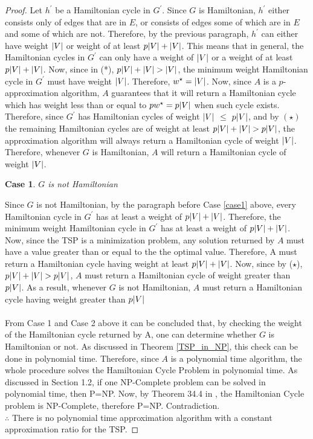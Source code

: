 \documentclass[12pt]{article}
\newtheorem{case}{Case}
\numberwithin{equation}{subsection}
\numberwithin{table}{subsection}
\begin{document}
\begin{proof}
Let $h^\prime$ be a Hamiltonian cycle in $G^\prime$. Since $G$ is Hamiltonian, $h^\prime$ either consists only of edges that are in $E$, or consists of edges some of which are in $E$ and some of which are not. Therefore, by the previous paragraph, $h^\prime$ can either have weight $\abs{V}$ or weight of at least $p\abs{V} + \abs{V}$. This means that in general, the Hamiltonian cycles in $G^\prime$ can only have a weight of $\abs{V}$ or a weight of at least $p\abs{V} + \abs{V}$. Now, since in (*), $p\abs{V} + \abs{V} > \abs{V}$, the minimum weight Hamiltonian cycle in $G^\prime$ must have weight $\abs{V}$. Therefore, $w^\star = \abs{V}$. Now, since $A$ is a $p$-approximation algorithm, $A$ guarantees that it will return a Hamiltonian cycle which has weight less than or equal to $pw^\star = p\abs{V}$ when such cycle exists. Therefore, since $G^\prime$ has Hamiltonian cycles of weight $\abs{V}$ $\leq$ $p\abs{V}$, and by $(\star)$ the remaining Hamiltonian cycles are of weight at least $ p\abs{V} + \abs{V} > p\abs{V}$, the approximation algorithm will always return a Hamiltonian cycle of weight $\abs{V}$. Therefore, whenever $G$ is Hamiltonian, $A$ will return a Hamiltonian cycle of weight $\abs{V}$.
\begin{case}
$G$ is not Hamiltonian
\end{case}
Since $G$ is not Hamiltonian, by the paragraph before Case \ref{case1} above, every Hamiltonian cycle in $G^\prime$ has at least a weight of $p\abs{V} + \abs{V}$. Therefore, the minimum weight Hamiltonian cycle in $G^\prime$ has at least a weight of $p\abs{V} + \abs{V}$. Now, since the TSP is a minimization problem, any solution returned by $A$ must have a value greater than or equal to the the optimal value. Therefore, A must return a Hamiltonian cycle having weight at least $p\abs{V} + \abs{V}$. Now, since by ($\star$), $p\abs{V} + \abs{V} > p\abs{V}$, $A$ must return a Hamiltonian cycle of weight greater than $p\abs{V}$. As a result, whenever $G$ is not Hamiltonian, $A$ must return a Hamiltonian cycle having weight greater than $p\abs{V}$ \\\\
From Case 1 and Case 2 above it can be concluded that, by checking the weight of the Hamiltonian cycle returned by A, one can determine whether $G$ is Hamiltonian or not. As discussed in Theorem \ref{TSP_in_NP}, this check can be done in polynomial time. Therefore, since $A$ is a polynomial time algorithm, the whole procedure solves the Hamiltonian Cycle Problem in polynomial time. As discussed in Section 1.2, if one NP-Complete problem can be solved in polynomial time, then P=NP. Now, by Theorem 34.4 in \cite{cormen_leiserson_rivest_stein}, the Hamiltonian Cycle problem is NP-Complete, therefore P=NP. Contradiction. \\
$\therefore$ There is no polynomial time approximation algorithm with a constant approximation ratio for the TSP.
\end{proof}
\end{document}
